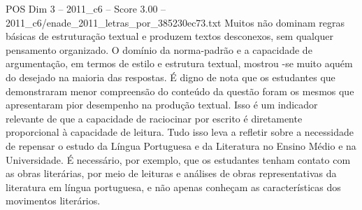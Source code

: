 \begin{textsample}{POS Dim 3 – 2011\_c6 – Score 3.00 – 2011\_c6/enade\_2011\_letras\_por\_385230ec73.txt}
Muitos não dominam regras básicas de estruturação textual e produzem textos desconexos, sem qualquer pensamento organizado.
O domínio da norma-padrão e a capacidade de argumentação, em termos de estilo e estrutura textual, mostrou -se muito aquém do desejado na maioria das respostas.
É digno de nota que os estudantes que demonstraram menor compreensão do conteúdo da questão foram os mesmos que apresentaram pior desempenho na produção textual.
Isso é um indicador relevante de que a capacidade de raciocinar por escrito é diretamente proporcional à capacidade de leitura.
Tudo isso leva a refletir sobre a necessidade de repensar o estudo da Língua Portuguesa e da Literatura no Ensino Médio e na Universidade.
É necessário, por exemplo, que os estudantes tenham contato com as obras literárias, por meio de leituras e análises de obras representativas da literatura em língua portuguesa, e não apenas conheçam as características dos movimentos literários.

\end{textsample}
